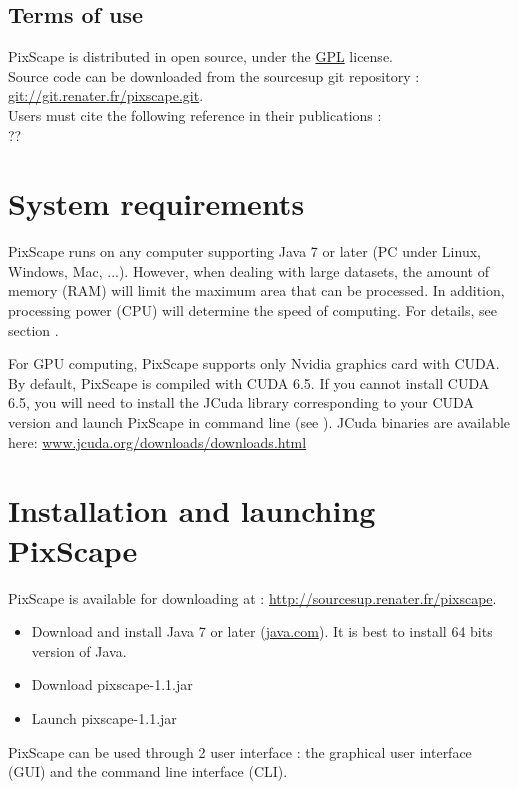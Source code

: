 \documentclass{report}
\begin{document}
\subsection{Terms of use}
PixScape is distributed in open source, under the \href{https://www.gnu.org/licenses/gpl-3.0.html}{GPL} license.\\
Source code can be downloaded from the sourcesup git repository : \url{git://git.renater.fr/pixscape.git}.\\
Users must cite the following reference in their publications :\\
??


\section{System requirements}

PixScape runs on any computer supporting Java 7 or later (PC under Linux, Windows, Mac, ...). 
However, when dealing with large datasets, the amount of memory (RAM) will limit the maximum area that can be processed. In addition, processing power (CPU) will determine the speed of computing. For details, see section .

For GPU computing, PixScape supports only Nvidia graphics card with CUDA. By default, PixScape is compiled with CUDA 6.5. If you cannot install CUDA 6.5, you will need to install the JCuda library corresponding to your CUDA version and launch PixScape in command line (see ). JCuda binaries are available here: \href{http://www.jcuda.org/downloads/downloads.html}{www.jcuda.org/downloads/downloads.html}

\section{Installation and launching PixScape}

PixScape is available for downloading at : \url{http://sourcesup.renater.fr/pixscape}.

\begin{itemize}
	\item Download and install Java 7 or later (\href{http://www.java.com}{java.com}). It is best to install 64 bits version of Java.
	\item Download pixscape-1.1.jar
	\item Launch pixscape-1.1.jar
\end{itemize}

PixScape can be used through 2 user interface : the graphical user interface (GUI) and the command line interface (CLI).
\end{document}
